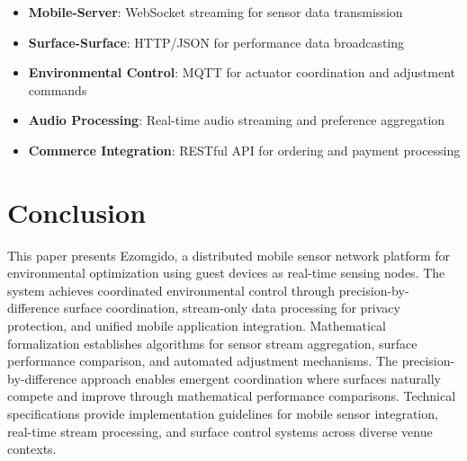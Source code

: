 \documentclass[12pt,a4paper]{article}
\begin{document}
\begin{itemize}
\item \textbf{Mobile-Server}: WebSocket streaming for sensor data transmission
\item \textbf{Surface-Surface}: HTTP/JSON for performance data broadcasting
\item \textbf{Environmental Control}: MQTT for actuator coordination and adjustment commands
\item \textbf{Audio Processing}: Real-time audio streaming and preference aggregation
\item \textbf{Commerce Integration}: RESTful API for ordering and payment processing
\end{itemize}

\section{Conclusion}

This paper presents Ezomgido, a distributed mobile sensor network platform for environmental optimization using guest devices as real-time sensing nodes. The system achieves coordinated environmental control through precision-by-difference surface coordination, stream-only data processing for privacy protection, and unified mobile application integration. Mathematical formalization establishes algorithms for sensor stream aggregation, surface performance comparison, and automated adjustment mechanisms. The precision-by-difference approach enables emergent coordination where surfaces naturally compete and improve through mathematical performance comparisons. Technical specifications provide implementation guidelines for mobile sensor integration, real-time stream processing, and surface control systems across diverse venue contexts.


\end{document}
